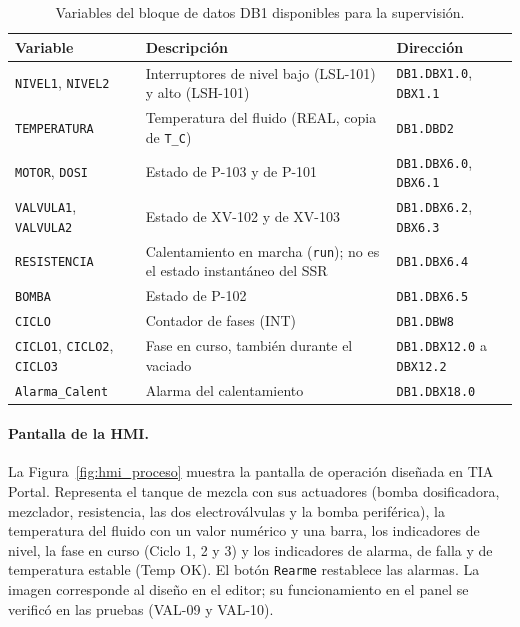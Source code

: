 \begin{table}[H]
\centering
\footnotesize
\caption{Variables del bloque de datos DB1 disponibles para la supervisión.}
\label{tab:db1_supervision}
\begin{tabularx}{\textwidth}{L{3.6cm}YL{3.2cm}}
\toprule
\textbf{Variable} & \textbf{Descripción} & \textbf{Dirección}\\
\midrule
\texttt{NIVEL1}, \texttt{NIVEL2} & Interruptores de nivel bajo (LSL-101) y alto (LSH-101) & \texttt{DB1.DBX1.0}, \texttt{DBX1.1}\\
\texttt{TEMPERATURA} & Temperatura del fluido (REAL, copia de \texttt{T\_C}) & \texttt{DB1.DBD2}\\
\texttt{MOTOR}, \texttt{DOSI} & Estado de P-103 y de P-101 & \texttt{DB1.DBX6.0}, \texttt{DBX6.1}\\
\texttt{VALVULA1}, \texttt{VALVULA2} & Estado de XV-102 y de XV-103 & \texttt{DB1.DBX6.2}, \texttt{DBX6.3}\\
\texttt{RESISTENCIA} & Calentamiento en marcha (\texttt{run}); no es el estado instantáneo del SSR & \texttt{DB1.DBX6.4}\\
\texttt{BOMBA} & Estado de P-102 & \texttt{DB1.DBX6.5}\\
\texttt{CICLO} & Contador de fases (INT) & \texttt{DB1.DBW8}\\
\texttt{CICLO1}, \texttt{CICLO2}, \texttt{CICLO3} & Fase en curso, también durante el vaciado & \texttt{DB1.DBX12.0} a \texttt{DBX12.2}\\
\texttt{Alarma\_Calent} & Alarma del calentamiento & \texttt{DB1.DBX18.0}\\
\bottomrule
\end{tabularx}
\end{table}

\paragraph{Pantalla de la HMI.} La Figura~\ref{fig:hmi_proceso} muestra la pantalla de operación diseñada en TIA Portal. Representa el tanque de mezcla con sus actuadores (bomba dosificadora, mezclador, resistencia, las dos electroválvulas y la bomba periférica), la temperatura del fluido con un valor numérico y una barra, los indicadores de nivel, la fase en curso (Ciclo 1, 2 y 3) y los indicadores de alarma, de falla y de temperatura estable (Temp OK). El botón \texttt{Rearme} restablece las alarmas. La imagen corresponde al diseño en el editor; su funcionamiento en el panel se verificó en las pruebas (VAL-09 y VAL-10).

